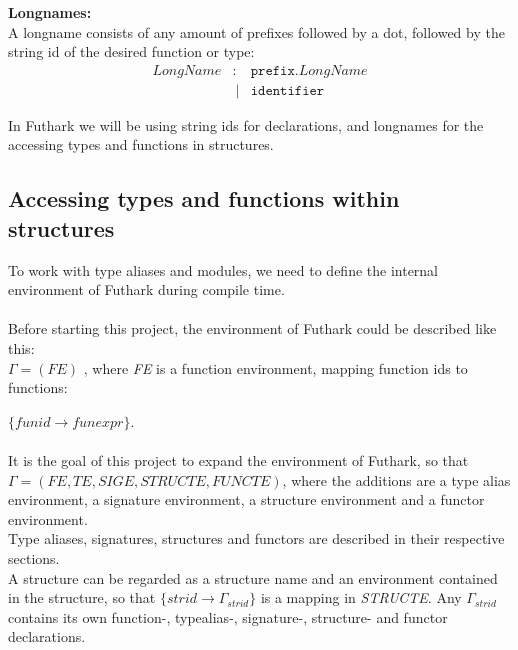 \begin{tcolorbox}
\textbf{Longnames:}\\
A longname consists of any amount of prefixes followed by a dot, followed by the
string id of the desired function or type:
\begin{align*}
LongName & :  & \texttt{prefix.}LongName \\
         &\ | & \texttt{identifier}
\end{align*}

In Futhark we will be using string ids for declarations, and longnames for
the accessing types and functions in structures.


\end{tcolorbox}
\subsection{Accessing types and functions within structures}
To work with type aliases and modules, we need to define the internal
environment of Futhark during compile time.\\
\\
Before starting this project, the environment of Futhark could be described like
this:\\
$\Gamma = (FE)$ , where \textit{FE} is a function environment, mapping function ids to functions:

 $\{funid \to funexpr\}$.
\\\\
It is the goal of this project to expand the environment of Futhark, so that\\[0.2em]
$\Gamma = (FE, TE, SIGE, STRUCTE, FUNCTE)$, where the additions are a type alias environment, a signature environment, a structure environment and a functor environment.\\[0.2em]
Type aliases, signatures, structures and functors are described in their respective
sections.\\
A structure can be regarded as a structure name and an environment contained in the structure, so that
$\{strid \to \Gamma_{strid}\}$ is a mapping in \textit{STRUCTE}.
\clearpage
Any $\Gamma_{strid}$ contains its own function-, typealias-, signature-, structure- and functor declarations.\\
\\

